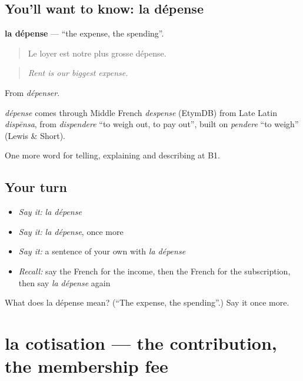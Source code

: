 \subsection*{You'll want to know: la dépense}
\textbf{la dépense} — \textquotedblleft{}the expense, the spending\textquotedblright{}.

\begin{quote}
Le loyer est notre plus grosse dépense.
\end{quote}

\begin{quote}
\emph{Rent is our biggest expense.}
\end{quote}

From \emph{dépenser}.

\begin{cousinweb}
\emph{dépense} comes through Middle French \emph{despense} (EtymDB) from Late Latin \emph{dispēnsa}, from \emph{dispendere} \textquotedblleft{}to weigh out, to pay out\textquotedblright{}, built on \emph{pendere} \textquotedblleft{}to weigh\textquotedblright{} (Lewis \& Short).
\end{cousinweb}

\begin{grammarlens}[title={What you've built}]
One more word for telling, explaining and describing at B1.
\end{grammarlens}

\subsection*{Your turn}
\begin{itemize}
\raggedright
  \item \emph{Say it:} \emph{la dépense}
  \item \emph{Say it:} \emph{la dépense}, once more
  \item \emph{Say it:} a sentence of your own with \emph{la dépense}
  \item \emph{Recall:} say the French for the income, then the French for the subscription, then say \emph{la dépense} again
\end{itemize}

\begin{tcolorbox}[breakable,colback=teal!4,colframe=teal!35!black,title={Before you move on}]
What does la dépense mean? (\textquotedblleft{}The expense, the spending\textquotedblright{}.) Say it once more.
\end{tcolorbox}
\section[la cotisation]{la cotisation — the contribution, the membership fee}


